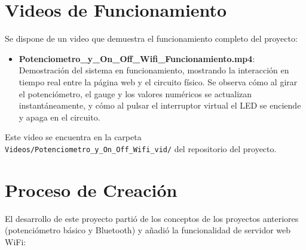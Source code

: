 \documentclass[12pt,a4paper]{article}
\begin{document}
\section{Videos de Funcionamiento}

Se dispone de un video que demuestra el funcionamiento completo del proyecto:

\begin{itemize}
    \item \textbf{Potenciometro\_y\_On\_Off\_Wifi\_Funcionamiento.mp4}: Demostración del sistema en funcionamiento, mostrando la interacción en tiempo real entre la página web y el circuito físico. Se observa cómo al girar el potenciómetro, el gauge y los valores numéricos se actualizan instantáneamente, y cómo al pulsar el interruptor virtual el LED se enciende y apaga en el circuito.
\end{itemize}

Este video se encuentra en la carpeta \texttt{Videos/Potenciometro\_y\_On\_Off\_Wifi\_vid/} del repositorio del proyecto.

\section{Proceso de Creación}

El desarrollo de este proyecto partió de los conceptos de los proyectos anteriores (potenciómetro básico y Bluetooth) y añadió la funcionalidad de servidor web WiFi:
\end{document}
